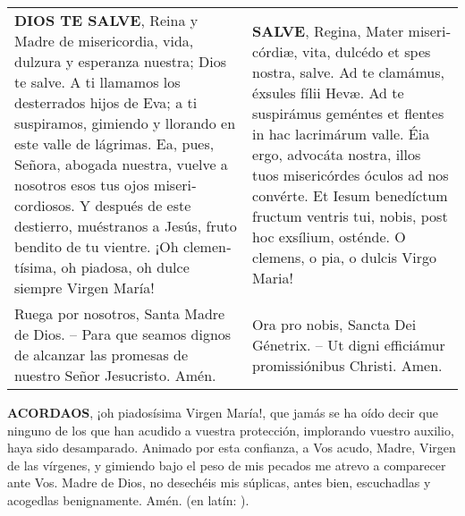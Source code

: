 \documentclass[./rosary.tex]{subfiles}
\begin{document}
\label{hailMaryQueen}
\begin{longtable} { p{} p{} }
    \textbf{DIOS TE SALVE}, Reina y Madre de mi­se­ri­cordia, vida, dulzura y esperanza nuestra; Dios te salve.
    A ti llamamos los desterrados hijos de Eva; a ti suspiramos, gimiendo y llorando en este valle de lágrimas.
    Ea, pues, Señora, abogada nuestra, vuelve a nosotros esos tus ojos mi­se­ri­cordiosos. Y después de este destierro, muéstranos a Jesús,
    fruto bendito de tu vientre. ¡Oh cle­men­tísima, oh piadosa, oh dulce siempre Virgen María!

     &

    \textbf{SALVE}, Regina, Mater mi­se­ri­córdiæ, vita, dulcédo et spes nostra, salve. Ad te clamámus, éxsules fílii Hevæ.
    Ad te suspirámus geméntes et flentes in hac lacrimárum valle. Éia ergo, advocáta nostra, illos tuos mi­se­ri­córdes óculos ad nos convérte.
    Et Iesum benedíctum fructum ventris tui, nobis, post hoc exsílium, osténde. O clemens, o pia, o dulcis Virgo Maria!            \\

    Ruega por nosotros, Santa Madre de Dios. -- Para que seamos dignos de alcanzar las promesas de nuestro Señor Jesucristo. Amén.                                           
    
     & 
    
    Ora pro nobis, Sancta Dei Génetrix. -- Ut digni efficiámur pro­mi­ssiónibus Christi. Amen.
\end{longtable}

\textbf{ACORDAOS}, ¡oh piadosísima Virgen María!, que jamás se ha oído decir que ninguno de los que han acudido a vuestra protección, 
implorando vuestro auxilio, haya sido desamparado. Animado por esta confianza, a Vos acudo, Madre, Virgen de las vírgenes, y gimiendo 
bajo el peso de mis pecados me atrevo a comparecer ante Vos. Madre de Dios, no desechéis mis súplicas, antes bien, escuchadlas y 
acogedlas benignamente. Amén. (en latín: ).
\end{document}
